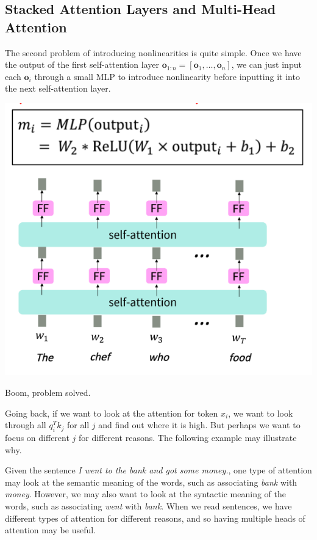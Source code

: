 \subsection{Stacked Attention Layers and Multi-Head Attention}

  The second problem of introducing nonlinearities is quite simple. Once we have the output of the first self-attention layer $\mathbf{o}_{1:n} = [\mathbf{o}_1, \ldots, \mathbf{o}_n]$, we can just input each $\mathbf{o}_i$ through a small MLP to introduce nonlinearity before inputting it into the next self-attention layer. 

  \begin{center}
    \includegraphics[scale=0.4]{img/stacked_self_attention_layers.png}
  \end{center}

  Boom, problem solved. 

  Going back, if we want to look at the attention for token $x_i$, we want to look through all $q_i^T k_j$ for all $j$ and find out where it is high. But perhaps we want to focus on different $j$ for different reasons. The following example may illustrate why. 

  \begin{example}
    Given the sentence \textit{I went to the bank and got some money.}, one type of attention may look at the semantic meaning of the words, such as associating \textit{bank} with \textit{money}. However, we may also want to look at the syntactic meaning of the words, such as associating \textit{went} with \textit{bank}. When we read sentences, we have different types of attention for different reasons, and so having multiple heads of attention may be useful. 
  \end{example}

